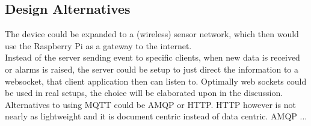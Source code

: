 \subsection*{Design Alternatives}
The device could be expanded to a (wireless) sensor network, which then would use the Raspberry Pi as a gateway to the internet.\\
Instead of the server sending event to specific clients, when new data is received or alarms is raised, the server could be setup to just direct the information to a websocket, that client application then can listen to. Optimally web sockets could be used in real setups, the choice will be elaborated upon in the discussion.\\
Alternatives to using MQTT could be AMQP or HTTP. HTTP however is not nearly as lightweight and it is document centric instead of data centric. AMQP ...